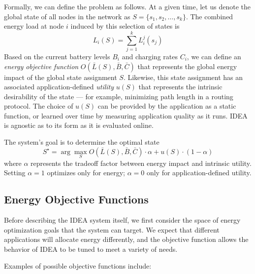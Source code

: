 \documentclass{sig-alternate}
\begin{document}
Formally, we can define the problem as follows. At a given time, let us
denote the global state of all nodes in the network as $S = \{ s_1, s_2,
\ldots, s_k \}$. The combined energy load at node $i$ induced by this
selection of states is \[ L_i(S) = \sum_{j=1}^k L_i^j(s_j) \] Based on the
current battery levels $B_i$ and charging rates $C_i$, we can define an
\textit{energy objective function} $O(\bar{L}(S), \bar{B}, \bar{C})$ that
represents the global energy impact of the global state assignment $S$.
Likewise, this state assignment has an associated application-defined
\textit{utility} $u(S)$ that represents the intrinsic desirability of the
state --- for example, minimizing path length in a routing protocol. The
choice of $u(S)$ can be provided by the application as a static function, or
learned over time by measuring application quality as it runs. IDEA is
agnostic as to its form as it is evaluated online. 

The system's goal is to determine the optimal state \[ S^\star = \arg
\max_{S} O(\bar{L}(S), \bar{B}, \bar{C}) \cdot \alpha + u(S) \cdot
(1-\alpha)\] where $\alpha$ represents the tradeoff factor between energy
impact and intrinsic utility. Setting $\alpha=1$ optimizes only for energy;
$\alpha=0$ only for application-defined utility. 

\subsection{Energy Objective Functions}
\label{subsec-energyobjectivefunctions}

Before describing the IDEA system itself, we first consider the space of
energy optimization goals that the system can target. We expect that
different applications will allocate energy differently, and the objective
function allows the behavior of IDEA to be tuned to meet a variety of needs. 

Examples of possible objective functions include:
\end{document}
